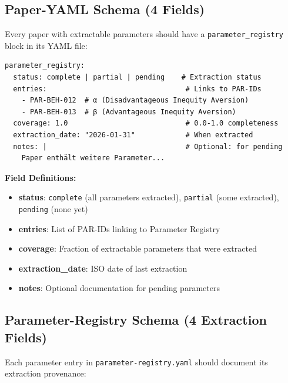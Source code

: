 \subsection{Paper-YAML Schema (4 Fields)}

Every paper with extractable parameters should have a \texttt{parameter\_registry}
block in its YAML file:

\begin{tcolorbox}[colback=green!5!white, colframe=green!75!black,
    title=Paper-YAML: parameter\_registry Schema]

\begin{verbatim}
parameter_registry:
  status: complete | partial | pending    # Extraction status
  entries:                                 # Links to PAR-IDs
    - PAR-BEH-012  # α (Disadvantageous Inequity Aversion)
    - PAR-BEH-013  # β (Advantageous Inequity Aversion)
  coverage: 1.0                            # 0.0-1.0 completeness
  extraction_date: "2026-01-31"            # When extracted
  notes: |                                 # Optional: for pending
    Paper enthält weitere Parameter...
\end{verbatim}

\textbf{Field Definitions:}
\begin{itemize}[nosep]
    \item \textbf{status}: \texttt{complete} (all parameters extracted),
          \texttt{partial} (some extracted), \texttt{pending} (none yet)
    \item \textbf{entries}: List of PAR-IDs linking to Parameter Registry
    \item \textbf{coverage}: Fraction of extractable parameters that were extracted
    \item \textbf{extraction\_date}: ISO date of last extraction
    \item \textbf{notes}: Optional documentation for pending parameters
\end{itemize}

\end{tcolorbox}

\subsection{Parameter-Registry Schema (4 Extraction Fields)}

Each parameter entry in \texttt{parameter-registry.yaml} should document
its extraction provenance:

